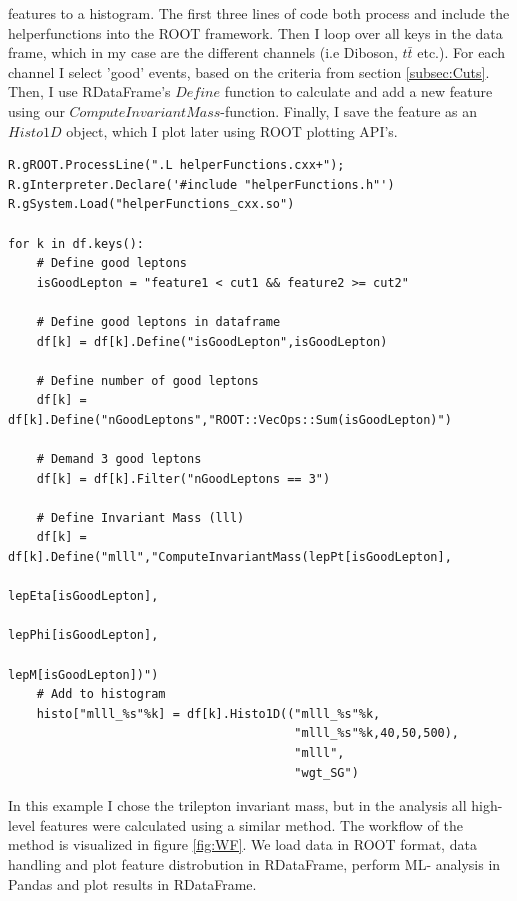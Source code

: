 features to a histogram. The first three lines of code both process and include the helperfunctions 
into the ROOT framework. Then I loop over all keys in the data frame, which in my case
are the different channels (i.e Diboson, $t\bar{t}$ etc.). For each channel I select 'good' events,
based on the criteria from section \ref{subsec:Cuts}. Then, I use RDataFrame's $Define$ function to calculate
and add a new feature using our $ComputeInvariantMass$-function. Finally, I save the feature as 
an $Histo1D$ object, which I plot later using ROOT plotting \ac{API}'s.
\lstset{style=Python}
\begin{lstlisting}[caption={Python-file for calling dataframe and calculating $M_{lll}$.},captionpos=b, label={lst:df_mlll}]
R.gROOT.ProcessLine(".L helperFunctions.cxx+");
R.gInterpreter.Declare('#include "helperFunctions.h"') 
R.gSystem.Load("helperFunctions_cxx.so")

for k in df.keys():
    # Define good leptons
    isGoodLepton = "feature1 < cut1 && feature2 >= cut2"

    # Define good leptons in dataframe
    df[k] = df[k].Define("isGoodLepton",isGoodLepton)

    # Define number of good leptons
    df[k] = df[k].Define("nGoodLeptons","ROOT::VecOps::Sum(isGoodLepton)")

    # Demand 3 good leptons 
    df[k] = df[k].Filter("nGoodLeptons == 3")

    # Define Invariant Mass (lll)
    df[k] = df[k].Define("mlll","ComputeInvariantMass(lepPt[isGoodLepton], 
                                                      lepEta[isGoodLepton], 
                                                      lepPhi[isGoodLepton], 
                                                      lepM[isGoodLepton])")
    # Add to histogram
    histo["mlll_%s"%k] = df[k].Histo1D(("mlll_%s"%k,
                                        "mlll_%s"%k,40,50,500),
                                        "mlll",
                                        "wgt_SG")     
\end{lstlisting}
In this example I chose the trilepton invariant mass, but in the analysis all high-level features were
calculated using a similar method. The workflow of the method is visualized in figure \ref{fig:WF}. We
load data in ROOT format, data handling and plot feature distrobution  in RDataFrame, perform \ac{ML}-
analysis in Pandas and plot results in RDataFrame.
